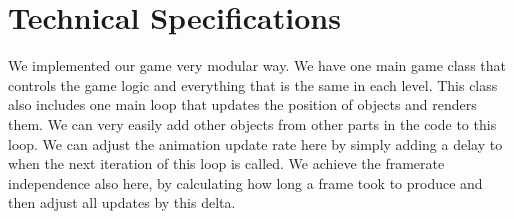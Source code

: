 \documentclass{article}
\begin{document}
\section{Technical Specifications}

We implemented our game very modular way. We have one main game class that controls the game logic 
and everything that is the same in each level. This class also includes one main loop that 
updates the position of objects and renders them. We can very easily add other objects from other parts in the 
code to this loop. We can adjust the animation update rate here 
by simply adding a delay to when the next iteration of this loop is called. 
We achieve the framerate independence also here, by calculating how long a frame took to produce 
and then adjust all updates by this delta. 
\end{document}
